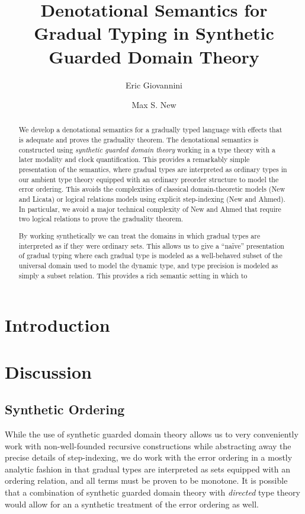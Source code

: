 \documentclass[acmsmall,screen]{acmart}
\begin{document}
\title{Denotational Semantics for Gradual Typing in Synthetic Guarded Domain Theory}
\author{Eric Giovannini}
\author{Max S. New}

\begin{abstract}
  We develop a denotational semantics for a gradually typed language
  with effects that is adequate and proves the graduality theorem.
  The denotational semantics is constructed using \emph{synthetic
  guarded domain theory} working in a type theory with a later
  modality and clock quantification.
  This provides a remarkably simple presentation of the semantics,
  where gradual types are interpreted as ordinary types in our ambient
  type theory equipped with an ordinary preorder structure to model
  the error ordering.
  This avoids the complexities of classical domain-theoretic models
  (New and Licata) or logical relations models using explicit
  step-indexing (New and Ahmed).
  In particular, we avoid a major technical complexity of New and
  Ahmed that require two logical relations to prove the graduality
  theorem.

  By working synthetically we can treat the domains in which gradual
  types are interpreted as if they were ordinary sets. This allows us
  to give a ``na\"ive'' presentation of gradual typing where each
  gradual type is modeled as a well-behaved subset of the universal
  domain used to model the dynamic type, and type precision is modeled
  as simply a subset relation.
  This provides a rich semantic setting in which to 
\end{abstract}

\section{Introduction}




\section{Discussion}

\subsection{Synthetic Ordering}

While the use of synthetic guarded domain theory allows us to very
conveniently work with non-well-founded recursive constructions while
abstracting away the precise details of step-indexing, we do work with
the error ordering in a mostly analytic fashion in that gradual types
are interpreted as sets equipped with an ordering relation, and all
terms must be proven to be monotone.
%
It is possible that a combination of synthetic guarded domain theory
with \emph{directed} type theory would allow for an a synthetic
treatment of the error ordering as well.
\end{document}
